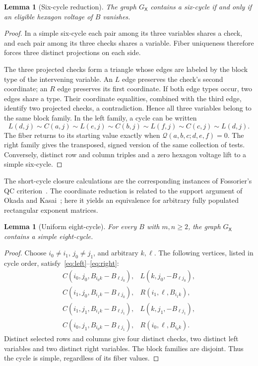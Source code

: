 \documentclass[11pt]{article}
\newtheorem{lemma}[theorem]{Lemma}
\theoremstyle{definition}
\theoremstyle{remark}
\newcommand{\GX}{G_{\mathsf X}}
\newcommand{\Q}{\mathcal Q}
\begin{document}
\begin{lemma}[Six-cycle reduction]\label{lem:six}
The graph $\GX$ contains a six-cycle if and only if an eligible hexagon
voltage of $B$ vanishes.
\end{lemma}
\begin{proof}
In a simple six-cycle each pair among its three variables shares a check,
and each pair among its three checks shares a variable. Fiber uniqueness
therefore forces three distinct projections on each side.

The three projected checks form a triangle whose edges are labeled by
the block type of the intervening variable. An $L$ edge preserves the
check's second coordinate; an $R$ edge preserves its first coordinate.
If both edge types occur, two edges share a type. Their coordinate
equalities, combined with the third edge, identify two projected checks,
a contradiction. Hence all three variables belong to the same block
family. In the left family, a cycle can be written
\[
 L(d,j)\sim C(a,j)\sim L(e,j)\sim C(b,j)
 \sim L(f,j)\sim C(c,j)\sim L(d,j).
\]
The fiber returns to its starting value exactly when
$\Q(a,b,c;d,e,f)=0$. The right family gives the transposed, signed
version of the same collection of tests. Conversely, distinct row and
column triples and a zero hexagon voltage lift to a simple six-cycle.
\end{proof}

The short-cycle closure calculations are the corresponding instances of
Fossorier's QC criterion~\cite{Fossorier2004}. The coordinate reduction
is related to the support argument of Okada and Kasai~\cite{OK2026};
here it yields an equivalence for arbitrary fully populated rectangular
exponent matrices.

\begin{lemma}[Uniform eight-cycle]\label{lem:eight}
For every $B$ with $m,n\ge2$, the graph $\GX$ contains a simple eight-cycle.
\end{lemma}
\begin{proof}
Choose $i_0\ne i_1$, $j_0\ne j_1$, and arbitrary $k,\ell$. The following
vertices, listed in cycle order, satisfy~\eqref{eq:left}--\eqref{eq:right}:
\[
\begin{array}{ll}
C(i_0,j_0,B_{i_0k}-B_{\ell j_0}), & L(k,j_0,-B_{\ell j_0}),\\
C(i_1,j_0,B_{i_1k}-B_{\ell j_0}), & R(i_1,\ell,B_{i_1k}),\\
C(i_1,j_1,B_{i_1k}-B_{\ell j_1}), & L(k,j_1,-B_{\ell j_1}),\\
C(i_0,j_1,B_{i_0k}-B_{\ell j_1}), & R(i_0,\ell,B_{i_0k}).
\end{array}
\]
Distinct selected rows and columns give four distinct checks, two distinct
left variables and two distinct right variables. The block families are
disjoint. Thus the cycle is simple, regardless of its fiber values.
\end{proof}
\end{document}
